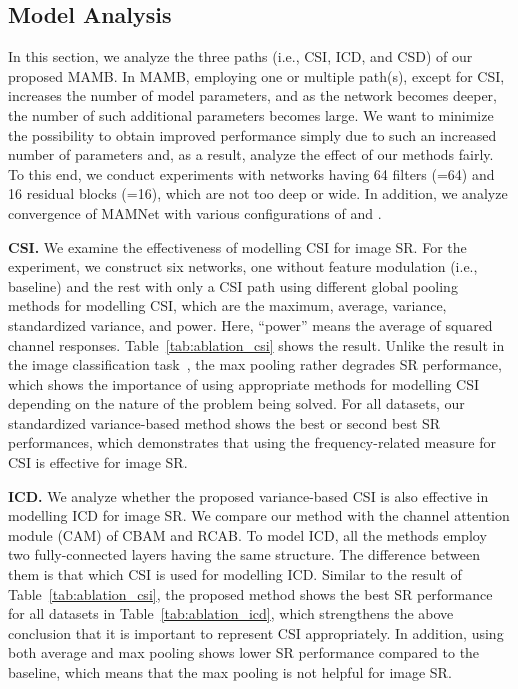 \documentclass[final,5p,times,twocolumn]{elsarticle}
\begin{document}
\subsection{Model Analysis}
\label{section:analysis}
In this section, we analyze the three paths (i.e., CSI, ICD, and CSD) of our proposed MAMB.
In MAMB, employing one or multiple path(s), except for CSI, increases the number of model parameters, and as the network becomes deeper, the number of such additional parameters becomes large.
We want to minimize the possibility to obtain improved performance simply due to such an increased number of parameters and, as a result, analyze the effect of our methods fairly. 
To this end, we conduct experiments with networks having 64 filters (=64) and 16 residual blocks (=16), which are not too deep or wide.
In addition, we analyze convergence of MAMNet with various configurations of  and .

\textbf{CSI.}
We examine the effectiveness of modelling CSI for image SR.
For the experiment, we construct six networks, one without feature modulation (i.e., baseline) and the rest with only a CSI path using different global pooling methods for modelling CSI, which are the maximum, average, variance, standardized variance, and power.
Here, ``power'' means the average of squared channel responses. 
Table~\ref{tab:ablation_csi} shows the result.
Unlike the result in the image classification task~\cite{woo2018cbam}, the max pooling rather degrades SR performance, which shows the importance of using appropriate methods for modelling CSI depending on the nature of the problem being solved.
For all datasets, our standardized variance-based method shows the best or second best SR performances, which demonstrates that using the frequency-related measure for CSI is effective for image SR. 

\textbf{ICD.}
We analyze whether the proposed variance-based CSI is also effective in modelling ICD for image SR.
We compare our method with the channel attention module (CAM) of CBAM and RCAB.
To model ICD, all the methods employ two fully-connected layers having the same structure.
The difference between them is that which CSI is used for modelling ICD. 
Similar to the result of Table~\ref{tab:ablation_csi}, the proposed method shows the best SR performance for all datasets in Table~\ref{tab:ablation_icd}, which strengthens the above conclusion that it is important to represent CSI appropriately.
In addition, using both average and max pooling shows lower SR performance compared to the baseline, which means that the max pooling is not helpful for image SR. 
\end{document}
